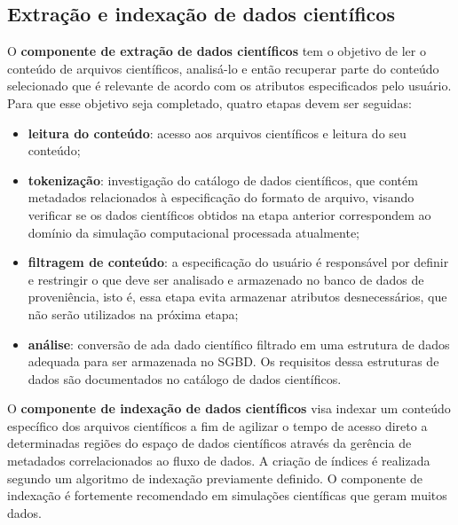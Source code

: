 \subsection{Extração e indexação de dados científicos}

O \textbf{componente de extração de dados científicos} tem o objetivo de ler o conteúdo de arquivos científicos, analisá-lo e então recuperar parte do conteúdo selecionado que é relevante de acordo com os atributos especificados pelo usuário. Para que esse objetivo seja completado, quatro etapas devem ser seguidas:

\begin{itemize}
    \item \textbf{leitura do conteúdo}: acesso aos arquivos científicos e leitura do seu conteúdo;
    \item \textbf{tokenização}: investigação do catálogo de dados científicos, que contém metadados relacionados à especificação do formato de arquivo, visando verificar se os dados científicos obtidos na etapa anterior correspondem ao domínio da simulação computacional processada atualmente;
    \item \textbf{filtragem de conteúdo}: a especificação do usuário é responsável por definir e restringir o que deve ser analisado e armazenado no banco de dados de proveniência, isto é, essa etapa evita armazenar atributos desnecessários, que não serão utilizados na próxima etapa;
    \item \textbf{análise}: conversão de ada dado científico filtrado em uma estrutura de dados adequada para ser armazenada no SGBD. Os requisitos dessa estruturas de dados são documentados no catálogo de dados científicos.
\end{itemize}

O \textbf{componente de indexação de dados científicos} visa indexar um conteúdo específico dos arquivos científicos a fim de agilizar o tempo de acesso direto a determinadas regiões do espaço de dados científicos através da gerência de metadados correlacionados ao fluxo de dados. A criação de índices é realizada segundo um algoritmo de indexação previamente definido. O componente de indexação é fortemente recomendado em simulações científicas que geram muitos dados.



